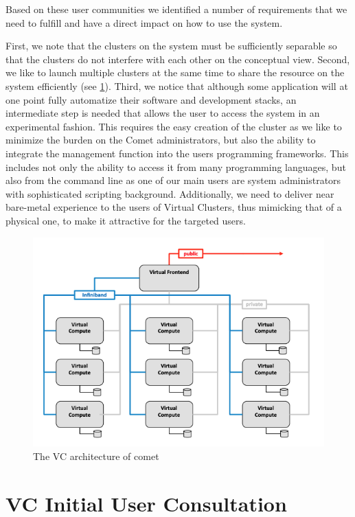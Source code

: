 \documentclass[sigconf,hyphens]{acmart}
\begin{document}
Based on these user communities we identified a number of requirements
that we need to fulfill and have a direct impact on how to use the
system.

First, we note that the clusters on the system must be sufficiently
separable so that the clusters do not interfere with each other on the
conceptual view. Second, we like to launch multiple clusters at the
same time to share the resource on the system efficiently (see
\ref{fig:vc-view}). Third, we notice that although some application
will at one point fully automatize their software and development
stacks, an intermediate step is needed that allows the user to access
the system in an experimental fashion. This requires the easy creation
of the cluster as we like to minimize the burden on the Comet
administrators, but also the ability to integrate the management
function into the users programming frameworks. This includes not only
the ability to access it from many programming languages, but also
from the command line as one of our main users are system
administrators with sophisticated scripting background. Additionally,
we need to deliver near bare-metal experience to the users of Virtual
Clusters, thus mimicking that of a physical one, to make it attractive
for the targeted users.

\begin{figure}[htb]
    \centering
    \includegraphics[width=1.0\columnwidth]{images/vc-view.png}
    \caption{The VC architecture of comet \cite{comet-vc}}
    \label{fig:vc-view}
\end{figure}


\section{VC Initial User Consultation}\label{sec:consult}
    
\end{document}
